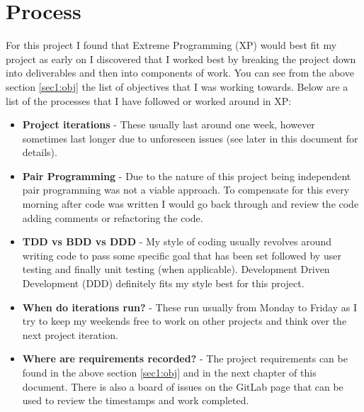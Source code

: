 \section{Process}
For this project I found that Extreme Programming (XP) would best fit my project as early on I discovered that I worked best by breaking the project down into deliverables and then into components of work. You can see from the above section \ref{sec1:obj} the list of objectives that I was working towards. Below are a list of the processes that I have followed or worked around in XP:
\begin{itemize}
	\item \textbf{Project iterations} - These usually last around one week, however sometimes last longer due to unforeseen issues (see later in this document for details).
	\item \textbf{Pair Programming} - Due to the nature of this project being independent pair programming was not a viable approach. To compensate for this every morning after code was written I would go back through and review the code adding comments or refactoring the code.
	\item \textbf{TDD vs BDD vs DDD} - My style of coding usually revolves around writing code to pass some specific goal that has been set followed by user testing and finally unit testing (when applicable). Development Driven Development (DDD) definitely fits my style best for this project.
	\item \textbf{When do iterations run?} - These run usually from Monday to Friday as I try to keep my weekends free to work on other projects and think over the next project iteration.
	\item \textbf{Where are requirements recorded?} - The project requirements can be found in the above section \ref{sec1:obj} and in the next chapter of this document. There is also a board of issues on the GitLab page that can be used to review the timestamps and work completed.
\end{itemize}


